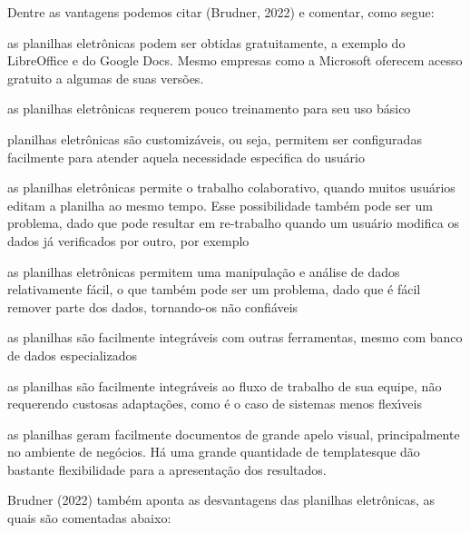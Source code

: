 \documentclass[
12pt,		%
openright,	%
twoside,  %
a4paper,			%
chapter=TITLE,		%
english,			%
french,				%
spanish,			%
brazil				%
]{USPSC-classe/USPSC_RedarTex}
\begin{document}
Dentre as vantagens podemos citar (Brudner, 2022) e comentar, como segue:











\begin{alineas}
\item as planilhas eletr\^onicas podem ser obtidas gratuitamente, a exemplo do LibreOffice e do Google Docs. Mesmo empresas como a Microsoft oferecem acesso gratuito a algumas de suas vers\~oes.
\item as planilhas eletr\^onicas requerem pouco treinamento para seu uso b\'asico
\item planilhas eletr\^onicas s\~ao \textquotedbl customiz\'aveis\textquotedbl , ou seja, permitem ser configuradas facilmente para atender aquela necessidade espec\'{\i}fica do usu\'ario
\item as planilhas eletr\^onicas permite o trabalho colaborativo, quando muitos usu\'arios editam a planilha ao mesmo tempo. Esse possibilidade tamb\'em pode ser um problema, dado que pode resultar em re-trabalho quando um usu\'ario modifica os dados j\'a verificados por outro, por exemplo
\item as planilhas eletr\^onicas permitem uma manipula\c{c}\~ao e an\'alise de dados relativamente f\'acil, o que tamb\'em pode ser um problema, dado que \'e f\'acil remover parte dos dados, tornando-os n\~ao confi\'aveis
\item as planilhas s\~ao facilmente integr\'aveis com outras  ferramentas, mesmo com banco de dados especializados
\item as planilhas s\~ao facilmente integr\'aveis ao fluxo de trabalho de sua equipe, n\~ao requerendo custosas adapta\c{c}\~oes, como \'e o caso de sistemas menos flex\'{\i}veis
\item as planilhas geram facilmente documentos de grande apelo visual, principalmente no ambiente de neg\'ocios. H\'a uma grande quantidade de \textquotedbl templates\textquotedbl  que d\~ao bastante flexibilidade para a apresenta\c{c}\~ao dos resultados.
\end{alineas}

 Brudner (2022) tamb\'em aponta as desvantagens das planilhas eletr\^onicas, as quais s\~ao comentadas abaixo:
\end{document}
